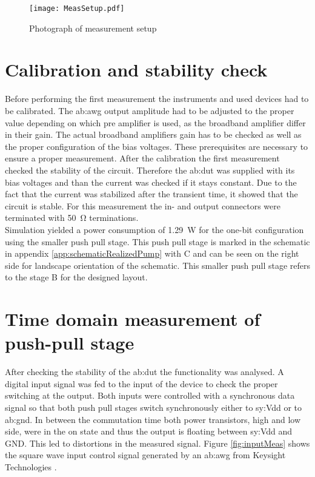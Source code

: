 \begin{figure}[htb!]
	\centering
  \texttt{[image: MeasSetup.pdf]}
	\caption{Photograph of measurement setup}
	\label{fig:PhotoMeasSetup}
\end{figure}

\section{Calibration and stability check}
Before performing the first measurement the instruments and used devices had to be calibrated.
The \gls{ab:awg} output amplitude had to be adjusted to the proper value depending on which pre amplifier is used, as the broadband amplifier differ in their gain.
The actual broadband amplifiers gain has to be checked as well as the proper configuration of the bias voltages.
These prerequisites are necessary to ensure a proper measurement.
After the calibration the first measurement checked the stability of the circuit.
Therefore the \gls{ab:dut} was supplied with its bias voltages and than the current was checked if it stays constant.
Due to the fact that the current was stabilized after the transient time, it showed that the circuit is stable.
For this measurement the in- and output connectors were terminated with \SI{50}{\ohm} terminations.\\
Simulation yielded a power consumption of \SI{1.29}{\watt} for the one-bit configuration using the smaller push pull stage.
This push pull stage is marked in the schematic in appendix \ref{app:schematicRealizedPump} with C and can be seen on the right side for landscape orientation of the schematic.
This smaller push pull stage refers to the stage B for the designed layout.

\section{Time domain measurement of push-pull stage}
After checking the stability of the \gls{ab:dut} the functionality was analysed.
A digital input signal was fed to the input of the device to check the proper switching at the output.
Both inputs were controlled with a synchronous data signal so that both push pull stages switch synchronously either to \gls{sy:Vdd} or to \gls{ab:gnd}. %
In between the commutation time both power transistors, high and low side, were in the on state and thus the output is floating between \gls{sy:Vdd} and GND.
This led to distortions in the measured signal.
Figure \ref{fig:inputMeas} shows the square wave input control signal generated by an \gls{ab:awg} from Keysight Technologies \cite{Keysight2015}.

